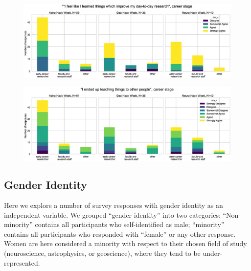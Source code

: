 \documentclass{aastex62}
\begin{document}
\begin{figure}[h!]
\centering
\includegraphics[width=\textwidth]{Q24_4_Q3_stackedbars.eps}
\caption{}
\label{fig:corr3}
\end{figure}

\begin{figure}[h!]
\centering
\includegraphics[width=\textwidth]{Q23_2_Q3_stackedbars.eps}
\caption{}
\label{fig:corr4}
\end{figure}

\clearpage

\subsection{Gender Identity}

Here we explore a number of survey responses with gender identity as an independent variable. We grouped ``gender identity'' into two categories: ``Non-minority'' contains all participants who self-identified as male; ``minority'' contains all participants who responded with ``female'' or any other response. Women are here considered a minority with respect to their chosen field of study (neuroscience, astrophysics, or geoscience), where they tend to be under-represented.
\end{document}
